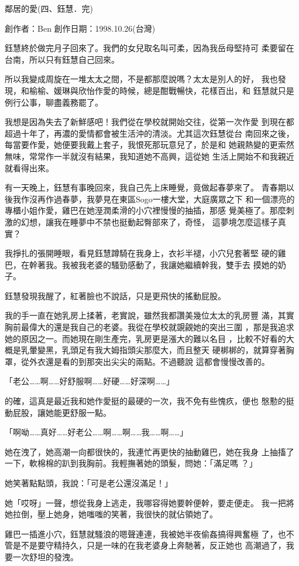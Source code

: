 鄰居的愛(四、鈺慧．完)

創作者：Ben
創作日期：1998.10.26(台灣)


鈺慧終於做完月子回來了。我們的女兒取名叫可柔，因為我岳母堅持可
柔要留在台南，所以只有鈺慧自己回來。

所以我變成周旋在一堆太太之間，不是都那麼說嗎？太太是別人的好，
我也發現，和榆榆、媛琳與欣怡作愛的時候，總是酣戰暢快，花樣百出，和
鈺慧就只是例行公事，聊盡義務罷了。

我想是因為失去了新鮮感吧！我們從在學校就開始交往，從第一次作愛
到現在都超過十年了，再濃的愛情都會被生活沖的清淡。尤其這次鈺慧從台
南回來之後，每當要作愛，她便要我戴上套子，我恨死那玩意兒了，於是和
她親熱變的更索然無味，常常作一半就沒有結果，我知道她不高興，這從她
生活上開始不和我親近就看得出來。

有一天晚上，鈺慧有事晚回來，我自己先上床睡覺，竟做起春夢來了。
青春期以後我作沒再作過春夢，我夢見在東區Sogo一樓大堂，大庭廣眾之下
和一個漂亮的專櫃小姐作愛，雞巴在她溼潤柔滑的小穴裡慢慢的抽插，那感
覺美極了。那麼刺激的幻想，讓我在睡夢中不禁也挺動起臀部來了，奇怪，
這夢境怎麼這樣子真實？

我掙扎的張開睡眼，看見鈺慧蹲騎在我身上，衣衫半褪，小穴兒套著堅
硬的雞巴，在幹著我。我被我老婆的騷勁感動了，我讓她繼續幹我，雙手去
摸她的奶子。

鈺慧發現我醒了，紅著臉也不說話，只是更飛快的搖動屁股。

我的手一直在她乳房上揉著，老實說，雖然我都讚美幾位太太的乳房豐
滿，其實胸前最偉大的還是我自己的老婆。我從在學校就覬覦她的突出三圍
，那是我追求她的原因之一。而她現在剛生產完，乳房更是漲大的難以名目
，比較不好看的大概是乳暈變黑，乳頭足有我大姆指頭尖那麼大，而且整天
硬梆梆的，就算穿著胸罩，從外衣還是看的到那突出尖尖的兩點。不過聽說
這都會慢慢改善的。

「老公……啊……好舒服啊……好硬……好深啊……」

的確，這真是最近我和她作愛挺的最硬的一次，我不免有些愧疚，便也
慇懃的挺動屁股，讓她能更舒服一點。

「啊呦……真好……好老公……啊……啊……我……啊……」

她在洩了，她高潮一向都很快的，我連忙再更快的抽動雞巴，她在我身
上抽搐了一下，軟棉棉的趴到我胸前。我輕撫著她的頭髮，問她：「滿足嗎
？」

她笑著點點頭，我說：「可是老公還沒滿足！」

她「哎呀」一聲，想從我身上逃走，我哪容得她要幹便幹，要走便走。
我一把將她拉倒，壓上她身，她嗤嗤的笑著，我很快的就佔領她了。

雞巴一插進小穴，鈺慧就騷浪的嗯聲連連，我被她半夜偷姦搞得興奮極
了，也不管是不是要守精持久，只是一味的在我老婆身上奔馳著，反正她也
高潮過了，我要一次舒坦的發洩。

